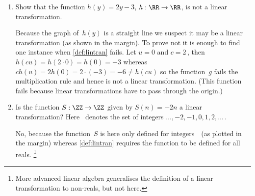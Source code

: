 \begin{example}[1D cases]
\begin{enumerate}
\item Show that the function \(h(y)=2y-3\), \(h:\RR\to\RR\), is not a linear transformation.
\begin{solution} 
Because the graph of~\(h(y)\) is a straight line we suspect it may be a linear transformation (as shown in the margin).
To prove not it is enough to find one instance when \autoref{def:lintran} fails. 
Let \(u=0\) and \(c=2\)\,, then \(h(cu)=h(2\cdot0)=h(0)=-3\) whereas \(ch(u)=2h(0)=2\cdot(-3)=-6\neq h(cu)\) so the function~\(g\) fails the multiplication rule and hence is not a linear transformation.
(This function fails because linear transformations have to pass through the origin.)
\end{solution}

\item Is the function \(S:\ZZ\to\ZZ\) given by \(S(n)=-2n\) a linear transformation?  Here \ZZ~denotes the set of integers \(\ldots,-2,-1,0,1,2,\ldots\)\,.
\begin{solution} 
No, because the function~\(S\) is here only defined for integers~\ZZ\ (as plotted in the margin) whereas \autoref{def:lintran} requires the function to be defined for all reals.
\footnote{More advanced linear algebra generalises the definition of a linear transformation to non-reals, but not here.}
\end{solution}

\end{enumerate}
\end{example}




